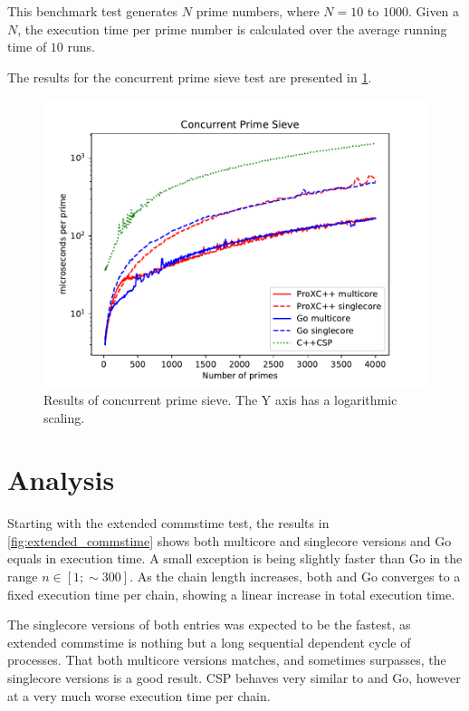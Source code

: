 This benchmark test generates $N$ prime numbers, where $N=10$ to $1000$. Given a $N$, the execution time per prime number is calculated over the average running time of $10$ runs.

The results for the concurrent prime sieve test are presented in \cref{fig:concurrent_sieve}.

\begin{figure}[h!]
    \centering
    \includegraphics[width=0.9\linewidth]{fig/concurrent_sieve}
    \caption{Results of concurrent prime sieve. The Y axis has a logarithmic scaling.}
    \label{fig:concurrent_sieve}
\end{figure}


\FloatBarrier
\section{Analysis}
\label{sec:analysis}


Starting with the extended commstime test, the results in \cref{fig:extended_commstime} shows both multicore and singlecore versions \Proxc{} and Go equals in execution time. A small exception is \Proxc{} being slightly faster than Go in the range $n\in[1;\sim{}300]$. As the chain length increases, both \Proxc{} and Go converges to a fixed execution time per chain, showing a linear increase in total execution time. 

The singlecore versions of both entries was expected to be the fastest, as extended commstime is nothing but a long sequential dependent cycle of processes. That both multicore versions matches, and sometimes surpasses, the singlecore versions is a good result. \Cpp{}CSP behaves very similar to \Proxc{} and Go, however at a very much worse execution time per chain. 

